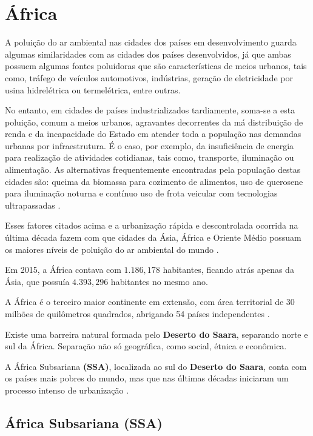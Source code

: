 \section{África}

A poluição do ar ambiental nas cidades dos países em desenvolvimento
guarda algumas similaridades com as cidades dos países desenvolvidos, já que 
ambas possuem algumas fontes poluidoras que são características de meios urbanos, 
tais como, tráfego de veículos automotivos, indústrias, geração de 
eletricidade por usina hidrelétrica ou termelétrica, entre outras. 

No entanto, em cidades de países industrializados tardiamente, soma-se a esta 
poluição, comum a meios urbanos, agravantes decorrentes da má distribuição de renda e da incapacidade do Estado em atender toda a população nas demandas urbanas por infraestrutura. É o caso, por exemplo, da insuficiência de energia para realização de atividades cotidianas, tais como, transporte, iluminação ou alimentação. 
As alternativas frequentemente encontradas pela população destas cidades são: queima da 
biomassa para cozimento de alimentos, uso de querosene para iluminação 
noturna e contínuo uso de frota veicular com tecnologias ultrapassadas
\citep{brauer2012}.

Esses fatores citados acima e a urbanização rápida e descontrolada ocorrida na
última década fazem com que cidades da Ásia, África e Oriente Médio possuam os maiores níveis de poluição do ar ambiental do mundo 
\citep{brauer2012}.

Em 2015, a África contava com $1.186,178$ habitantes, ficando atrás 
apenas da Ásia, que possuía $4.393,296$ habitantes no mesmo ano.%
 
A África é o terceiro maior continente em extensão, com área territorial 
de 30 milhões de quilômetros quadrados, abrigando 54 países independentes 
\citep{UN}.

Existe uma barreira natural formada pelo \textbf{Deserto do Saara},
separando norte e sul da África. Separação não só geográfica, como
social, étnica e econômica. 

A África Subsariana \textbf{(SSA)}, localizada ao sul do 
\textbf{Deserto do Saara}, conta com os países mais pobres do mundo, mas que 
nas últimas décadas iniciaram um processo intenso de urbanização \citep{UN}. 
   	
\subsection{África Subsariana \textbf{(SSA)}}

